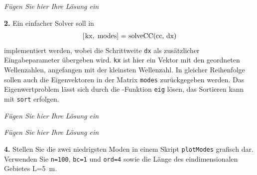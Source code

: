 \documentclass[Protokollheft.tex]{subfiles}
\begin{document}
\emph{Fügen Sie hier Ihre Lösung ein}

        \begin{framed}
	\noindent \textbf{2.} Ein einfacher Solver soll in
                    \begin{align}
                        \lstinline{[kx, modes] = solveCC(cc, dx)} \label{meth:solveCC}
                    \end{align}
                    implementiert werden, wobei die Schrittweite \lstinline{dx} als zusätzlicher Eingabeparameter übergeben wird.
                    \lstinline{kx} ist hier ein Vektor mit den geordneten Wellenzahlen, angefangen mit der kleinsten Wellenzahl. In gleicher
                    Reihenfolge sollen auch die Eigenvektoren in der Matrix \lstinline{modes} zurückgegeben werden.
                    Das Eigenwertproblem lässt sich durch die \matlab-Funktion \lstinline{eig} lösen, das Sortieren kann mit \lstinline{sort} erfolgen.\label{exer:solveCC}
\end{framed}

\emph{Fügen Sie hier Ihre Lösung ein}


\emph{Fügen Sie hier Ihre Lösung ein}

        \begin{framed}
	\noindent \textbf{4.} Stellen Sie die zwei niedrigsten Moden in einem Skript \lstinline{plotModes} grafisch dar.
        Verwenden Sie \lstinline{n=100}, \lstinline{bc=1} und \lstinline{ord=4} sowie die Länge des eindimensionalen Gebietes L=\SI{5}{m}.\label{exer:plotModes}
\end{framed}
\end{document}

